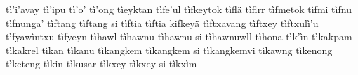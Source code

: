 tì'i'avay\hspace{2mm}
tì'ipu\hspace{2mm}
tì'o'\hspace{2mm}
tì'ong\hspace{2mm}
tìeyktan\hspace{2mm}
tìfe'ul\hspace{2mm}
tìfkeytok\hspace{2mm}
tìflä\hspace{2mm}
tìflrr\hspace{2mm}
tìfmetok\hspace{2mm}
tìfmi\hspace{2mm}
tìfnu\hspace{2mm}
tìfnunga'\hspace{2mm}
tìftang\hspace{2mm}
tìftang si\hspace{2mm}
tìftia\hspace{2mm}
tìftia kifkeyä\hspace{2mm}
tìftxavang\hspace{2mm}
tìftxey\hspace{2mm}
tìftxulì'u\hspace{2mm}
tìfyawìntxu\hspace{2mm}
tìfyeyn\hspace{2mm}
tìhawl\hspace{2mm}
tìhawnu\hspace{2mm}
tìhawnu si\hspace{2mm}
tìhawnuwll\hspace{2mm}
tìhona\hspace{2mm}
tìk'ìn\hspace{2mm}
tìkakpam\hspace{2mm}
tìkakrel\hspace{2mm}
tìkan\hspace{2mm}
tìkanu\hspace{2mm}
tìkangkem\hspace{2mm}
tìkangkem si\hspace{2mm}
tìkangkemvi\hspace{2mm}
tìkawng\hspace{2mm}
tìkenong\hspace{2mm}
tìketeng\hspace{2mm}
tìkin\hspace{2mm}
tìkusar\hspace{2mm}
tìkxey\hspace{2mm}
tìkxey si\hspace{2mm}
tìkxìm\hspace{2mm}
